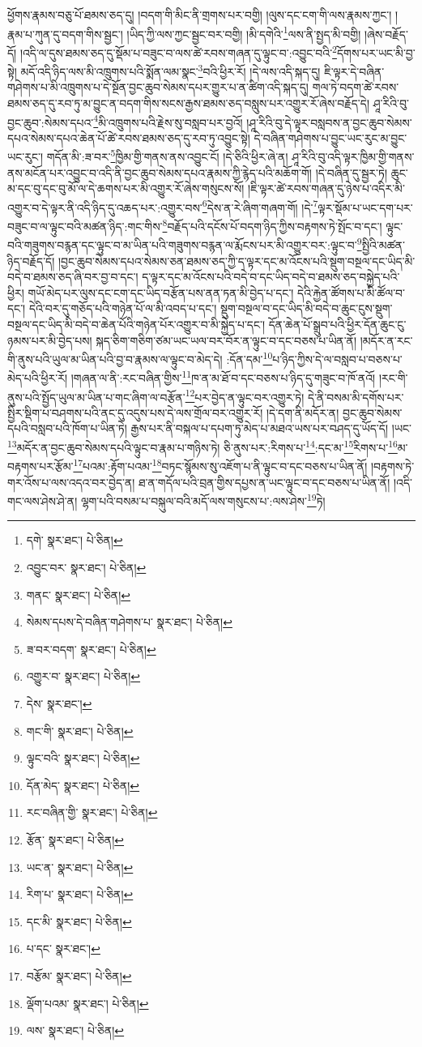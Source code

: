 ཕྱོགས་རྣམས་བཅུ་པོ་ཐམས་ཅད་དུ། །བདག་གི་མིང་ནི་གྲགས་པར་བགྱི། །ལུས་དང་ངག་གི་ལས་རྣམས་ཀྱང་། །རྣམ་པ་ཀུན་དུ་བདག་གིས་སྦྱང་། །ཡིད་ཀྱི་ལས་ཀྱང་སྦྱང་བར་བགྱི། །མི་དགེའི་\footnote{དགེ་  སྣར་ཐང་།  པེ་ཅིན། }ལས་ནི་སྤྱད་མི་བགྱི། །ཞེས་བརྗོད་དོ། །འདི་ལ་དུས་ཐམས་ཅད་དུ་སྡོམ་པ་བཟུང་བ་ལས་ཚེ་རབས་གཞན་དུ་ལྟུང་བ་:འབྱུང་བའི་\footnote{འབྱུང་བར་  སྣར་ཐང་།  པེ་ཅིན། }དོགས་པར་ཡང་མི་བྱ་སྟེ། མདོ་འདི་ཉིད་ལས་མི་འཁྲུགས་པའི་སྨོན་ལམ་སྣང་\footnote{གནང་  སྣར་ཐང་།  པེ་ཅིན། }བའི་ཕྱིར་རོ། །དེ་ལས་འདི་སྐད་དུ། ཇི་ལྟར་དེ་བཞིན་གཤེགས་པ་མི་འཁྲུགས་པ་དེ་སྔོན་བྱང་ཆུབ་སེམས་དཔར་གྱུར་པ་ན་ཚིག་འདི་སྐད་དུ། གལ་ཏེ་བདག་ཚེ་རབས་ཐམས་ཅད་དུ་རབ་ཏུ་མ་བྱུང་ན་བདག་གིས་སངས་རྒྱས་ཐམས་ཅད་བསླུས་པར་འགྱུར་རོ་ཞེས་བརྗོད་དེ། ཤཱ་རིའི་བུ་བྱང་ཆུབ་:སེམས་དཔའ་\footnote{སེམས་དཔས་དེ་བཞིན་གཤེགས་པ་  སྣར་ཐང་།  པེ་ཅིན། }མི་འཁྲུགས་པའི་རྗེས་སུ་བསླབ་པར་བྱའོ། །ཤཱ་རིའི་བུ་དེ་ལྟར་བསླབས་ན་བྱང་ཆུབ་སེམས་དཔའ་སེམས་དཔའ་ཆེན་པོ་ཚེ་རབས་ཐམས་ཅད་དུ་རབ་ཏུ་འབྱུང་སྟེ། དེ་བཞིན་གཤེགས་པ་བྱུང་ཡང་རུང་མ་བྱུང་ཡང་རུང་། གདོན་མི་:ཟ་བར་\footnote{ཟ་བར་བདག་  སྣར་ཐང་།  པེ་ཅིན། }ཁྱིམ་གྱི་གནས་ནས་འབྱུང་ངོ། །དེ་ཅིའི་ཕྱིར་ཞེ་ན། ཤཱ་རིའི་བུ་འདི་ལྟར་ཁྱིམ་གྱི་གནས་ནས་མངོན་པར་འབྱུང་བ་འདི་ནི་བྱང་ཆུབ་སེམས་དཔའ་རྣམས་ཀྱི་རྙེད་པའི་མཆོག་གོ། །དེ་བཞིན་དུ་སྦྱར་ཏེ། ཆུང་མ་དང་བུ་དང་བུ་མོ་ལ་དེ་ཆགས་པར་མི་འགྱུར་རོ་ཞེས་གསུངས་སོ། །ཇི་ལྟར་ཚེ་རབས་གཞན་དུ་ཉེས་པ་འདིར་མི་འགྱུར་བ་དེ་ལྟར་ནི་འདི་ཉིད་དུ་འཆད་པར་:འགྱུར་བས་\footnote{འགྱུར་བ་  སྣར་ཐང་།  པེ་ཅིན། }དེས་ན་རེ་ཞིག་གཞག་གོ། །དེ་\footnote{དེས་  སྣར་ཐང་། }ལྟར་སྡོམ་པ་ཡང་དག་པར་བཟུང་བ་ལ་ལྟུང་བའི་མཚན་ཉིད་:གང་གིས་\footnote{གང་གི་  སྣར་ཐང་།  པེ་ཅིན། }བརྗོད་པའི་དངོས་པོ་བདག་ཉིད་ཀྱིས་བརྟགས་ཏེ་སྤོང་བ་དང་། ལྟུང་བའི་གཟུགས་བརྙན་དང་ལྟུང་བ་མ་ཡིན་པའི་གཟུགས་བརྙན་ལ་རྨོངས་པར་མི་འགྱུར་བར་:ལྟུང་བ་\footnote{ལྟུང་བའི་  སྣར་ཐང་།  པེ་ཅིན། }སྤྱིའི་མཚན་ཉིད་བརྗོད་དོ། །བྱང་ཆུབ་སེམས་དཔའ་སེམས་ཅན་ཐམས་ཅད་ཀྱི་ད་ལྟར་དང་མ་འོངས་པའི་སྡུག་བསྔལ་དང་ཡིད་མི་བདེ་བ་ཐམས་ཅད་ཞི་བར་བྱ་བ་དང་། ད་ལྟར་དང་མ་འོངས་པའི་བདེ་བ་དང་ཡིད་བདེ་བ་ཐམས་ཅད་བསྐྱེད་པའི་ཕྱིར། གཡོ་མེད་པར་ལུས་དང་ངག་དང་ཡིད་བརྩོན་པས་ནན་ཏན་མི་བྱེད་པ་དང་། དེའི་རྐྱེན་ཚོགས་པ་མི་ཚོལ་བ་དང་། དེའི་བར་དུ་གཅོད་པའི་གཉེན་པོ་ལ་མི་འབད་པ་དང་། སྡུག་བསྔལ་བ་དང་ཡིད་མི་བདེ་བ་ཆུང་ངུས་སྡུག་བསྔལ་དང་ཡིད་མི་བདེ་བ་ཆེན་པོའི་གཉེན་པོར་འགྱུར་བ་མི་སྐྱེད་པ་དང་། དོན་ཆེན་པོ་སྒྲུབ་པའི་ཕྱིར་དོན་ཆུང་ངུ་ཉམས་པར་མི་བྱེད་པས། སྐད་ཅིག་གཅིག་ཙམ་ཡང་ཡལ་བར་བོར་ན་ལྟུང་བ་དང་བཅས་པ་ཡིན་ནོ། །མདོར་ན་རང་གི་ནུས་པའི་ཡུལ་མ་ཡིན་པའི་བྱ་བ་རྣམས་ལ་ལྟུང་བ་མེད་དེ། :དོན་དམ་\footnote{དོན་མེད་  སྣར་ཐང་།  པེ་ཅིན། }པ་ཉིད་ཀྱིས་དེ་ལ་བསླབ་པ་བཅས་པ་མེད་པའི་ཕྱིར་རོ། །གཞན་ལ་ནི་:རང་བཞིན་གྱིས་\footnote{རང་བཞིན་གྱི་  སྣར་ཐང་།  པེ་ཅིན། }ཁ་ན་མ་ཐོ་བ་དང་བཅས་པ་ཉིད་དུ་གཟུང་བ་ཁོ་ནའོ། །རང་གི་ནུས་པའི་སྤྱོད་ཡུལ་མ་ཡིན་པ་གང་ཞིག་ལ་བརྩོན་\footnote{རྩོན་  སྣར་ཐང་།  པེ་ཅིན། }པར་བྱེད་ན་ལྟུང་བར་འགྱུར་ཏེ། དེ་ནི་བསམ་མི་དགོས་པར་སྤྱིར་སྡིག་པ་བཤགས་པའི་ནང་དུ་འདུས་པས་དེ་ལས་གྲོལ་བར་འགྱུར་རོ། །དེ་དག་ནི་མདོར་ན། བྱང་ཆུབ་སེམས་དཔའི་བསླབ་པའི་ཁོག་པ་ཡིན་ཏེ། རྒྱས་པར་ནི་བསྐལ་པ་དཔག་ཏུ་མེད་པ་མཐའ་ཡས་པར་བཤད་དུ་ཡོད་དོ། །ཡང་\footnote{ཡང་ན་  སྣར་ཐང་།  པེ་ཅིན། }མདོར་ན་བྱང་ཆུབ་སེམས་དཔའི་ལྟུང་བ་རྣམ་པ་གཉིས་ཏེ། ཅི་ནུས་པར་:རིགས་པ་\footnote{རིག་པ་  སྣར་ཐང་།  པེ་ཅིན། }:དང་མ་\footnote{དང་མི་  སྣར་ཐང་།  པེ་ཅིན། }རིགས་པ་\footnote{པ་དང་  སྣར་ཐང་། }མ་བརྟགས་པར་རྩོམ་\footnote{བརྩོམ་  སྣར་ཐང་།  པེ་ཅིན། }པའམ་:རྟོག་པའམ་\footnote{ལྡོག་པའམ་  སྣར་ཐང་།  པེ་ཅིན། }བཏང་སྙོམས་སུ་འཇོག་པ་ནི་ལྟུང་བ་དང་བཅས་པ་ཡིན་ནོ། །བརྟགས་ཏེ་གར་འོས་པ་ལས་འདའ་བར་བྱེད་ན། ཐ་ན་གདོལ་པའི་བྲན་གྱིས་དཔྱས་ན་ཡང་ལྟུང་བ་དང་བཅས་པ་ཡིན་ནོ། །འདི་གང་ལས་ཤེས་ཤེ་ན། ལྷག་པའི་བསམ་པ་བསྐུལ་བའི་མདོ་ལས་གསུངས་པ་:ལས་ཤེས་\footnote{ལས་  སྣར་ཐང་།  པེ་ཅིན། }ཏེ། 